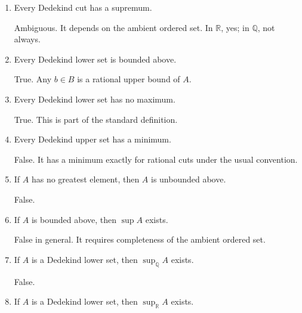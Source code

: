 \documentclass{essay}
\begin{document}
\begin{enumerate}[label=\arabic*., itemsep=10pt]

\item Every Dedekind cut has a supremum.

\begin{answer}
Ambiguous. It depends on the ambient ordered set. In $\mathbb{R}$, yes; in $\mathbb{Q}$, not always.
\end{answer}

\item Every Dedekind lower set is bounded above.

\begin{answer}
True. Any $b\in B$ is a rational upper bound of $A$.
\end{answer}

\item Every Dedekind lower set has no maximum.

\begin{answer}
True. This is part of the standard definition.
\end{answer}

\item Every Dedekind upper set has a minimum.

\begin{answer}
False. It has a minimum exactly for rational cuts under the usual convention.
\end{answer}

\item If $A$ has no greatest element, then $A$ is unbounded above.

\begin{answer}
False.
\end{answer}

\item If $A$ is bounded above, then $\sup A$ exists.

\begin{answer}
False in general. It requires completeness of the ambient ordered set.
\end{answer}

\item If $A$ is a Dedekind lower set, then $\sup_{\mathbb{Q}}A$ exists.

\begin{answer}
False.
\end{answer}

\item If $A$ is a Dedekind lower set, then $\sup_{\mathbb{R}}A$ exists.


\end{enumerate}
\end{document}
